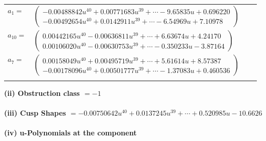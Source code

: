 \documentclass[1p]{elsarticle_modified}
\theoremstyle{definition}
\begin{document}
\begin{tabular}{m{7pt} m{180pt} m{7pt} m{180pt} }
\flushright $a_{1}=$&$\begin{pmatrix}-0.00488842 u^{40}+0.00771683 u^{39}+\cdots-9.65835 u+0.696220\\-0.00492654 u^{40}+0.0142911 u^{39}+\cdots-6.54969 u+7.10978\end{pmatrix}$ \\
\flushright $a_{10}=$&$\begin{pmatrix}0.00442165 u^{40}-0.00636811 u^{39}+\cdots+6.63674 u+4.24170\\0.00106020 u^{40}-0.00630753 u^{39}+\cdots-0.350233 u-3.87164\end{pmatrix}$ \\
\flushright $a_{7}=$&$\begin{pmatrix}0.00158049 u^{40}+0.00495719 u^{39}+\cdots+5.61614 u+8.57387\\-0.00178096 u^{40}+0.00501777 u^{39}+\cdots-1.37083 u+0.460536\end{pmatrix}$\\&\end{tabular}
\flushleft \textbf{(ii) Obstruction class $= -1$}\\~\\
\flushleft \textbf{(iii) Cusp Shapes $= -0.00750642 u^{40}+0.0137245 u^{39}+\cdots+0.520985 u-10.6626$}\\~\\
\newpage\renewcommand{\arraystretch}{1}
\flushleft \textbf{(iv) u-Polynomials at the component}\newline \\
\end{document}
